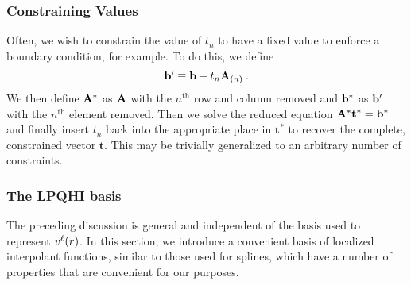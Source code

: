 \subsubsection{Constraining Values}
Often, we wish to constrain the value of $t_n$ to have a fixed value
to enforce a boundary condition, for example.  To do this, we define
\begin{equation}
\mathbf{b}' \equiv \mathbf{b} - t_n \mathbf{A}_{(n)}\:.
\end{equation}
We then define $\mathbf{A}^*$ as $\mathbf{A}$ with the $n^{\text{th}}$ row and column
removed and $\mathbf{b}^*$ as $\mathbf{b}'$ with the $n^{\text{th}}$ element removed.  Then
we solve the reduced equation $\mathbf{A}^* \mathbf{t}^* = \mathbf{b}^*$ and
finally insert $t_n$ back into the appropriate place in $\mathbf{t}^*$
to recover the complete, constrained vector $\mathbf{t}$.  This may be
trivially generalized to an arbitrary number of constraints.
\label{sec:contraints}

\subsubsection{The LPQHI basis}
The preceding discussion is general and independent of the basis used to
represent $v^\ell(r)$.  In this section, we introduce a convenient basis
of localized interpolant functions, similar to those used for
splines, which have a number of properties that are convenient for
our purposes.  

